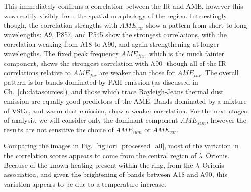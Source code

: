      This immediately confirms a correlation between the IR and AME, however this was readily visibly from the spatial morphology of the region. Interestingly though, the correlation strengths with $AME_{var}$ show a pattern from short to long wavelengths: A9, P857, and P545 show the strongest correlations, with the correlation weaking from A18 to A90, and again strengthening at longer wavelengths. The fixed peak frequency $AME_{fix}$, which is the much fainter component, shows the strongest correlation with A90- though all of the IR correlations relative to $AME_{fix}$ are weaker than those for $AME_{var}$. The overall pattern is for bands dominated by PAH emission (as discussed in Ch.~\ref{ch:datasources}), and those which trace Rayleigh-Jeans thermal dust emission are equally good predictors of the AME. Bands dominated by a mixture of VSGs, and warm dust emission, show a weaker correlation. For the next stages of analysis, we will consider only the dominant component $AME_{sum}$, however the results are not sensitive the choice of $AME_{sum}$ or $AME_{var}$.

     Comparing the images in Fig.~\ref{fig:lori_processed_all}, most of the variation in the correlation scores appears to come from the central region of $\lambda$~Orionis. Because of the known heating present within the ring, from the $\lambda$~Orionis association, and given the brightening of bands between A18 and A90, this variation appears to be due to a temperature increase.
